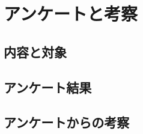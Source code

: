 
\chapter{アンケートと考察}

\thispagestyle{myheadings}
\section{内容と対象}

\section{アンケート結果}
\section{アンケートからの考察}